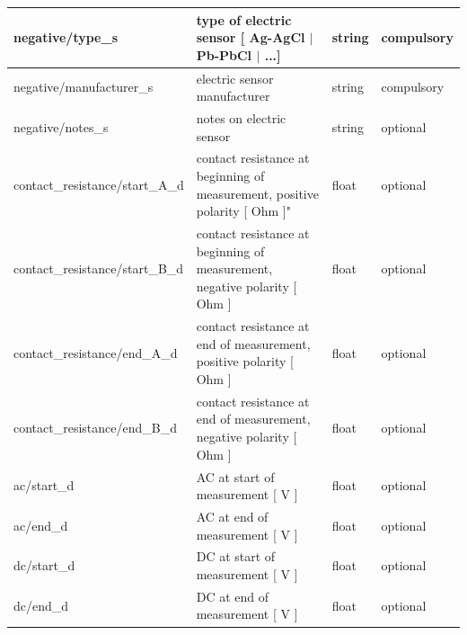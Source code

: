 \documentclass{article}
\begin{document}
\begin{table}[htb!]
\begin{tabular}{|l|p{3in}|l|l|}
		negative/type\_s & type of electric sensor [ Ag-AgCl $|$ Pb-PbCl $|$ ...] & string & compulsory \\ \hline
		negative/manufacturer\_s & electric sensor manufacturer & string & compulsory \\ \hline
		negative/notes\_s & notes on electric sensor & string & optional \\ \hline
		contact\_resistance/start\_A\_d & contact resistance at beginning of measurement, positive polarity [ Ohm ]" & float & optional \\ \hline
		contact\_resistance/start\_B\_d & contact resistance at beginning of measurement, negative polarity [ Ohm ] & float & optional \\ \hline
		contact\_resistance/end\_A\_d & contact resistance at end of measurement, positive polarity [ Ohm ] & float & optional \\ \hline
		contact\_resistance/end\_B\_d & contact resistance at end of measurement, negative polarity [ Ohm ] & float & optional \\ \hline
		ac/start\_d & AC at start of measurement [ V ] & float & optional \\ \hline
		ac/end\_d & AC at end of measurement [ V ] & float & optional \\ \hline
		dc/start\_d & DC at start of measurement [ V ] & float & optional \\ \hline
		dc/end\_d & DC at end of measurement [ V ] & float & optional \\ \hline
		
	\end{tabular}
	\label{tab:electric01}
\end{table}	
\end{document}
